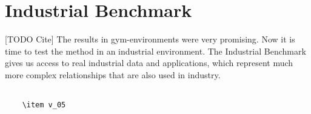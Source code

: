 \section{Industrial Benchmark}
[TODO Cite]
The results in gym-environments were very promising. Now it is time to test the method in an industrial environment. The Industrial Benchmark gives us access to real industrial data and applications, which represent much more complex relationships that are also used in industry.

\subsection{}

\begin{lstlisting}
    \item v_05
\end{lstlisting}